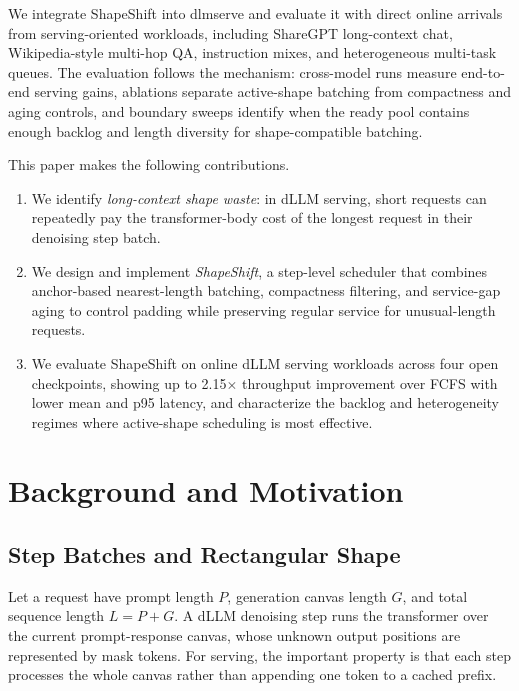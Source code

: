 \documentclass[letterpaper]{article} \usepackage[submission]{aaai2027} \usepackage[hyphens]{url} \usepackage{graphicx} \usepackage{subcaption} \urlstyle{rm} \def\UrlFont{\rm} \usepackage{natbib} \usepackage{amsmath} \usepackage{amssymb} \usepackage{booktabs} \usepackage{multirow} \usepackage{algorithm} \usepackage{algorithmic}
\begin{document}
We integrate ShapeShift into dlmserve and evaluate it with direct online arrivals from serving-oriented workloads, including ShareGPT long-context chat, Wikipedia-style multi-hop QA, instruction mixes, and heterogeneous multi-task queues. The evaluation follows the mechanism: cross-model runs measure end-to-end serving gains, ablations separate active-shape batching from compactness and aging controls, and boundary sweeps identify when the ready pool contains enough backlog and length diversity for shape-compatible batching.

This paper makes the following contributions.

\begin{enumerate}
  \item We identify \emph{long-context shape waste}: in dLLM serving, short requests can repeatedly pay the transformer-body cost of the longest request in their denoising step batch.
  \item We design and implement \emph{ShapeShift}, a step-level scheduler that combines anchor-based nearest-length batching, compactness filtering, and service-gap aging to control padding while preserving regular service for unusual-length requests.
  \item We evaluate ShapeShift on online dLLM serving workloads across four open checkpoints, showing up to 2.15$\times$ throughput improvement over FCFS with lower mean and p95 latency, and characterize the backlog and heterogeneity regimes where active-shape scheduling is most effective.
\end{enumerate}

\section{Background and Motivation}

\subsection{Step Batches and Rectangular Shape}

Let a request have prompt length $P$, generation canvas length $G$, and total sequence length $L=P+G$. A dLLM denoising step runs the transformer over the current prompt-response canvas, whose unknown output positions are represented by mask tokens. For serving, the important property is that each step processes the whole canvas rather than appending one token to a cached prefix.
\end{document}
